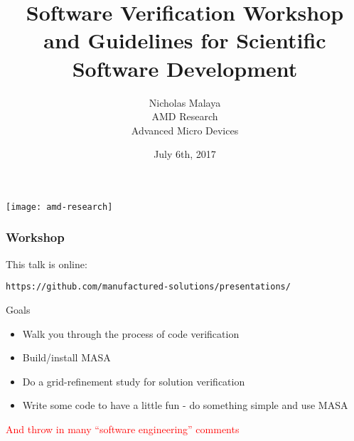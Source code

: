 \documentclass[mathserif]{beamer}
\date{July 6th, 2017}
\author[Nicholas Malaya]{Nicholas Malaya \\
$~$ \\
{\small
AMD Research \\
Advanced Micro Devices}
}
\title[Software Verification Workshop]{Software Verification Workshop\\
and Guidelines for Scientific Software Development}
\begin{document}
\begin{frame}
  \titlepage
  \begin{flushright}
    \texttt{[image: amd-research]}\\
  \end{flushright}
\end{frame}

\begin{frame}[fragile]
  \frametitle{Workshop}
  This talk is online:
\begin{verbatim}https://github.com/manufactured-solutions/presentations/\end{verbatim}

  \begin{block}{Goals}
    \begin{itemize} 
    \item Walk you through the process of code verification
    \item Build/install MASA
    \item Do a grid-refinement study for solution verification
    \item Write some code to have a little fun - do something simple
      and use MASA
    \end{itemize}    
  \end{block}

 \textcolor{red}{And throw in many ``software engineering'' comments}
\end{frame}
\end{document}
